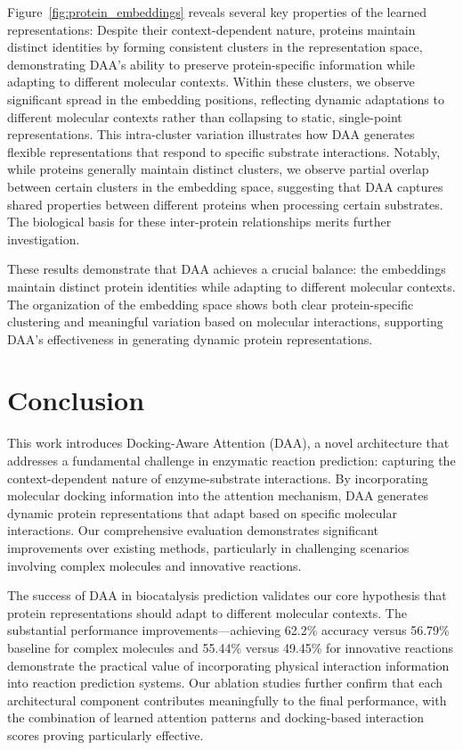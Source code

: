 \documentclass[sigconf]{acmart}
\begin{document}
Figure~\ref{fig:protein_embeddings} reveals several key properties of the learned representations: Despite their context-dependent nature, proteins maintain distinct identities by forming consistent clusters in the representation space, demonstrating DAA's ability to preserve protein-specific information while adapting to different molecular contexts. Within these clusters, we observe significant spread in the embedding positions, reflecting dynamic adaptations to different molecular contexts rather than collapsing to static, single-point representations. This intra-cluster variation illustrates how DAA generates flexible representations that respond to specific substrate interactions. Notably, while proteins generally maintain distinct clusters, we observe partial overlap between certain clusters in the embedding space, suggesting that DAA captures shared properties between different proteins when processing certain substrates. The biological basis for these inter-protein relationships merits further investigation.

These results demonstrate that DAA achieves a crucial balance: the embeddings maintain distinct protein identities while adapting to different molecular contexts. The organization of the embedding space shows both clear protein-specific clustering and meaningful variation based on molecular interactions, supporting DAA's effectiveness in generating dynamic protein representations.

\section{Conclusion}
This work introduces Docking-Aware Attention (DAA), a novel architecture that addresses a fundamental challenge in enzymatic reaction prediction: capturing the context-dependent nature of enzyme-substrate interactions. By incorporating molecular docking information into the attention mechanism, DAA generates dynamic protein representations that adapt based on specific molecular interactions. Our comprehensive evaluation demonstrates significant improvements over existing methods, particularly in challenging scenarios involving complex molecules and innovative reactions.
 
 The success of DAA in biocatalysis prediction validates our core hypothesis that protein representations should adapt to different molecular contexts. The substantial performance improvements—achieving 62.2\% accuracy versus 56.79\% baseline for complex molecules and 55.44\% versus 49.45\% for innovative reactions demonstrate the practical value of incorporating physical interaction information into reaction prediction systems. Our ablation studies further confirm that each architectural component contributes meaningfully to the final performance, with the combination of learned attention patterns and docking-based interaction scores proving particularly effective.
\end{document}
